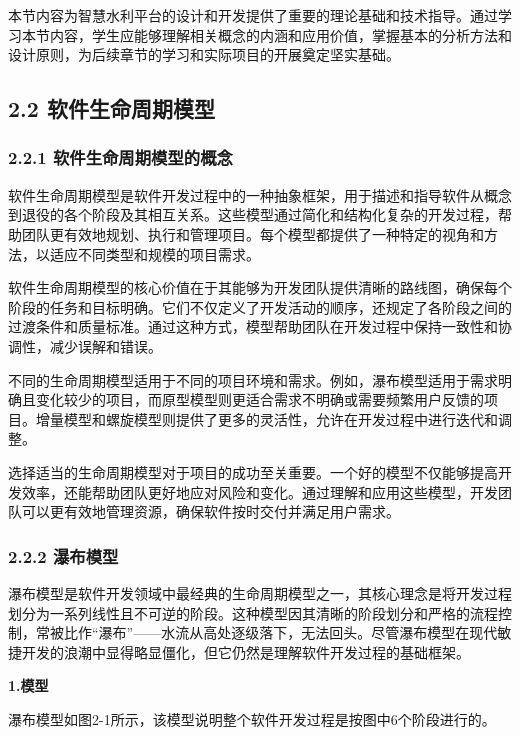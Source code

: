 本节内容为智慧水利平台的设计和开发提供了重要的理论基础和技术指导。通过学习本节内容，学生应能够理解相关概念的内涵和应用价值，掌握基本的分析方法和设计原则，为后续章节的学习和实际项目的开展奠定坚实基础。

\subsection{2.2 软件生命周期模型}\label{ux8f6fux4ef6ux751fux547dux5468ux671fux6a21ux578b}

\subsubsection{2.2.1 软件生命周期模型的概念}\label{ux8f6fux4ef6ux751fux547dux5468ux671fux6a21ux578bux7684ux6982ux5ff5}

软件生命周期模型是软件开发过程中的一种抽象框架，用于描述和指导软件从概念到退役的各个阶段及其相互关系。这些模型通过简化和结构化复杂的开发过程，帮助团队更有效地规划、执行和管理项目。每个模型都提供了一种特定的视角和方法，以适应不同类型和规模的项目需求。

软件生命周期模型的核心价值在于其能够为开发团队提供清晰的路线图，确保每个阶段的任务和目标明确。它们不仅定义了开发活动的顺序，还规定了各阶段之间的过渡条件和质量标准。通过这种方式，模型帮助团队在开发过程中保持一致性和协调性，减少误解和错误。

不同的生命周期模型适用于不同的项目环境和需求。例如，瀑布模型适用于需求明确且变化较少的项目，而原型模型则更适合需求不明确或需要频繁用户反馈的项目。增量模型和螺旋模型则提供了更多的灵活性，允许在开发过程中进行迭代和调整。

选择适当的生命周期模型对于项目的成功至关重要。一个好的模型不仅能够提高开发效率，还能帮助团队更好地应对风险和变化。通过理解和应用这些模型，开发团队可以更有效地管理资源，确保软件按时交付并满足用户需求。

\subsubsection{2.2.2 瀑布模型}\label{ux7011ux5e03ux6a21ux578b}

瀑布模型是软件开发领域中最经典的生命周期模型之一，其核心理念是将开发过程划分为一系列线性且不可逆的阶段。这种模型因其清晰的阶段划分和严格的流程控制，常被比作``瀑布''------水流从高处逐级落下，无法回头。尽管瀑布模型在现代敏捷开发的浪潮中显得略显僵化，但它仍然是理解软件开发过程的基础框架。

\textbf{1.模型}

瀑布模型如图2-1所示，该模型说明整个软件开发过程是按图中6个阶段进行的。

